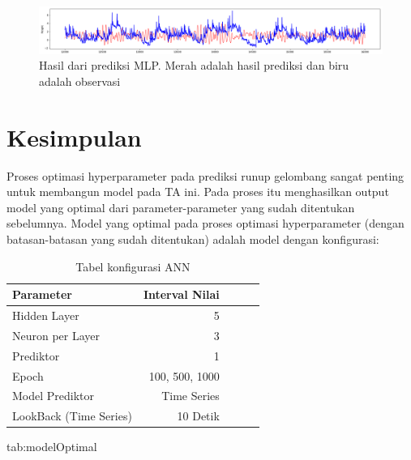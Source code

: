 \begin{figure}
  \begin{center}
    \includegraphics[scale=0.27]{plots/test-18-perbandingan.png}
  \end{center}
  \caption{Hasil dari prediksi MLP. Merah adalah hasil prediksi dan biru adalah observasi}
  \label{fig:perbandingan}
\end{figure}
\FloatBarrier

\section{Kesimpulan}
Proses optimasi hyperparameter pada prediksi runup gelombang sangat penting untuk membangun model pada TA ini. Pada proses itu menghasilkan output model yang optimal dari parameter-parameter yang sudah ditentukan sebelumnya. Model yang optimal pada proses optimasi hyperparameter (dengan batasan-batasan yang sudah ditentukan) adalah model dengan konfigurasi:

\begin{table}[h]
  \caption*{Tabel konfigurasi ANN}
  \begin{center}
    \begin{tabular}{lrrrr}
      \toprule
      Parameter &        Interval Nilai \\
      \midrule
      Hidden Layer            & 5    \\
      Neuron per Layer        & 3    \\
      Prediktor               & 1    \\
      Epoch                   & 100, 500, 1000  \\
      Model Prediktor         & Time Series \\
      LookBack (Time Series)  & 10 Detik \\

      \bottomrule
    \end{tabular}
  \end{center}
  {tab:modelOptimal}
\end{table}


